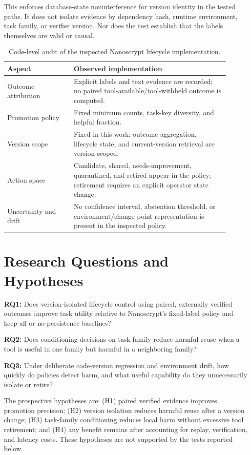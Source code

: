 \documentclass[11pt]{article}
\begin{document}
This enforces database-state noninterference for version identity in the tested paths. It does not isolate evidence by dependency hash, runtime environment, task family, or verifier version. Nor does the test establish that the labels themselves are valid or causal.

\begin{table}[h]
\centering
\begin{tabular}{p{0.27\linewidth}p{0.63\linewidth}}
\toprule
Aspect & Observed implementation \\
\midrule
Outcome attribution & Explicit labels and text evidence are recorded; no paired tool-available/tool-withheld outcome is computed. \\
Promotion policy & Fixed minimum counts, task-key diversity, and helpful fraction. \\
Version scope & Fixed in this work: outcome aggregation, lifecycle state, and current-version retrieval are version-scoped. \\
Action space & Candidate, shared, needs-improvement, quarantined, and retired appear in the policy; retirement requires an explicit operator state change. \\
Uncertainty and drift & No confidence interval, abstention threshold, or environment/change-point representation is present in the inspected policy. \\
\bottomrule
\end{tabular}
\caption{Code-level audit of the inspected Nanoscrypt lifecycle implementation.}
\end{table}

\section{Research Questions and Hypotheses}
\textbf{RQ1:} Does version-isolated lifecycle control using paired, externally verified outcomes improve task utility relative to Nanoscrypt's fixed-label policy and keep-all or no-persistence baselines?

\textbf{RQ2:} Does conditioning decisions on task family reduce harmful reuse when a tool is useful in one family but harmful in a neighboring family?

\textbf{RQ3:} Under deliberate code-version regression and environment drift, how quickly do policies detect harm, and what useful capability do they unnecessarily isolate or retire?

The prospective hypotheses are: (H1) paired verified evidence improves promotion precision; (H2) version isolation reduces harmful reuse after a version change; (H3) task-family conditioning reduces local harm without excessive tool retirement; and (H4) any benefit remains after accounting for replay, verification, and latency costs. These hypotheses are not supported by the tests reported below.
\end{document}
